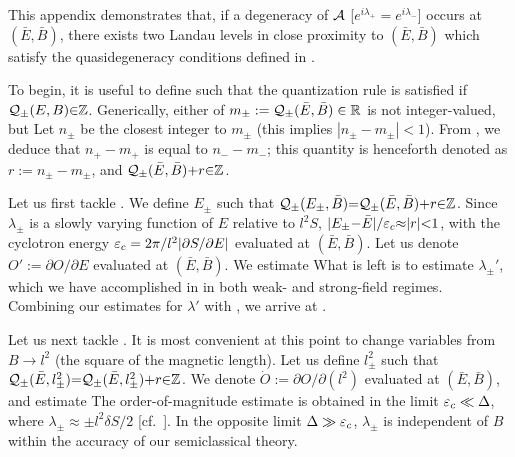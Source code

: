 \documentclass[aps, prb, showpacs, twocolumn, notitlepage, superscriptaddress]{revtex4-1}
\begin{document}
This appendix demonstrates that, if a degeneracy of ${\cal A}$ [$e^{i\lambda_+}{=}e^{i\lambda_-}$] occurs at $(\bar{E},\bar{B})$, there exists two Landau levels in close proximity to $(\bar{E},\bar{B})$ which satisfy the quasidegeneracy conditions defined in .

To begin, it is useful to define
such that the quantization rule  is satisfied if ${\cal Q}_{\pm}(E,B){\in}\mathbb{Z}$. 
Generically, either of $m_{\pm}:={\cal Q}_{\pm}(\bar{E},\bar{B})\in \mathbb{R}$ is not integer-valued, but 
Let $n_{\pm}$ be the closest integer to $m_{\pm}$ (this implies $|n_{\pm}-m_{\pm}|<1$).  From , we deduce that $n_+-m_+$ is equal to $n_--m_-$; this quantity is henceforth denoted as $r:= n_{\pm}-m_{\pm}$, and  ${\cal Q}_{\pm}(\bar{E},\bar{B}){+}r{\in} \mathbb{Z}$. 

Let us first tackle . We define $E_{\pm}$ such that ${\cal Q}_{\pm}(E_{\pm},\bar{B}){=}{\cal Q}_{\pm}(\bar{E},\bar{B}){+}r{\in} \mathbb{Z}$. Since  $\lambda_{\pm}$ is a slowly varying function of $E$ relative to $l^2S$, $|E_{\pm}{-}\bar{E}|/\varepsilon_c{\approx} |r|{<}1$, with the cyclotron energy $\varepsilon_c=2\pi/l^2|\partial S/\partial E|$ evaluated at $(\bar{E},\bar{B})$. Let us denote $O':=\partial O/\partial E$ evaluated at $(\bar{E},\bar{B})$. We estimate
What is left is to estimate $\lambda_{\pm}'$, which we have accomplished in  in both weak- and strong-field regimes. Combining our estimates for $\lambda'$ with , we  arrive at .


Let us next tackle . It is most convenient at this point to change variables from $B\rightarrow l^2$ (the square of the magnetic length). Let us  define   $l^2_{\pm}$ such that ${\cal Q}_{\pm}(\bar{E},l^2_{\pm}){=}{\cal Q}_{\pm}(\bar{E},l^2_{\pm}){+}r{\in} \mathbb{Z}$. We denote  $\dot{O}:=\partial O/\partial(l^2)$ evaluated at $(\bar{E},\bar{B})$, and estimate
The order-of-magnitude estimate is obtained in the limit $\varepsilon_c\ll \Delta$, where $\lambda_{\pm}\approx \pm l^2\delta S/2$ [cf.\ ]. In the opposite limit $\Delta\gg \varepsilon_c$, $\lambda_{\pm}$ is independent of $B$ within the accuracy of our semiclassical theory.    
\end{document}
